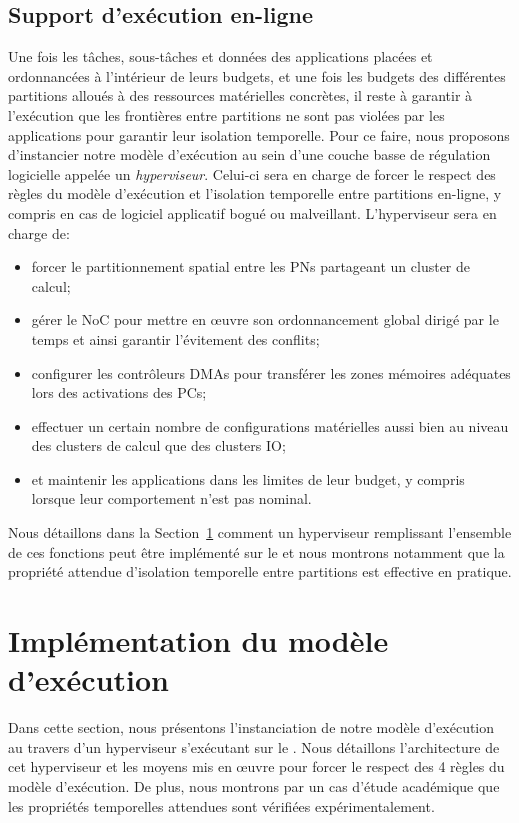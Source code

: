 \documentclass[main.tex]{subfiles}
\begin{document}
\subsection{Support d'exécution en-ligne}
Une fois les tâches, sous-tâches et données des applications placées et ordonnancées à l'intérieur de leurs budgets, et une fois les budgets des différentes partitions alloués à des ressources matérielles concrètes, il reste à garantir à l'exécution que les frontières entre partitions ne sont pas violées par les applications pour garantir leur isolation temporelle. Pour ce faire, nous proposons d'instancier notre modèle d'exécution au sein d'une couche basse de régulation logicielle appelée un \emph{hyperviseur}. Celui-ci sera en charge de forcer le respect des règles du modèle d'exécution et l'isolation temporelle entre partitions en-ligne, y compris en cas de logiciel applicatif bogué ou malveillant. L'hyperviseur sera en charge de:
\begin{itemize}
    \item forcer le partitionnement spatial entre les PNs partageant un cluster de calcul;
    \item gérer le NoC pour mettre en œuvre son ordonnancement global dirigé par le temps et ainsi garantir l'évitement des conflits;
    \item configurer les contrôleurs DMAs pour transférer les zones mémoires adéquates lors des activations des PCs;
    \item effectuer un certain nombre de configurations matérielles aussi bien au niveau des clusters de calcul que des clusters IO;
    \item et maintenir les applications dans les limites de leur budget, y compris lorsque leur comportement n'est pas nominal.
\end{itemize}
Nous détaillons dans la Section~\ref{sec_resumeFr_hv} comment un hyperviseur remplissant l'ensemble de ces fonctions peut être implémenté sur le \mppalong et nous montrons notamment que la propriété attendue d'isolation temporelle entre partitions est effective en pratique.





\section{Implémentation du modèle d'exécution}
\label{sec_resumeFr_hv}
Dans cette section, nous présentons l'instanciation de notre modèle d'exécution au travers d'un hyperviseur s'exécutant sur le \mppalong. Nous détaillons l'architecture de cet hyperviseur et les moyens mis en œuvre pour forcer le respect des 4 règles du modèle d'exécution. De plus, nous montrons par un cas d'étude académique que les propriétés temporelles attendues sont vérifiées expérimentalement.
\end{document}
